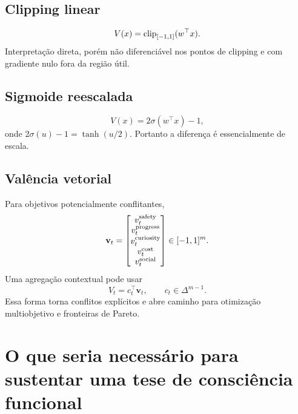 \subsection{Clipping linear}
\begin{equation}
V(x)=\operatorname{clip}_{[-1,1]}(w^\top x).
\end{equation}
Interpretação direta, porém não diferenciável nos pontos de clipping e com gradiente nulo fora da região útil.

\subsection{Sigmoide reescalada}
\begin{equation}
V(x)=2\sigma(w^\top x)-1,
\end{equation}
onde \(2\sigma(u)-1=\tanh(u/2)\). Portanto a diferença é essencialmente de escala.

\subsection{Valência vetorial}

Para objetivos potencialmente conflitantes,
\begin{equation}
\mathbf v_t=
\begin{bmatrix}
v_t^{\rm safety}\\
v_t^{\rm progress}\\
v_t^{\rm curiosity}\\
v_t^{\rm cost}\\
v_t^{\rm social}
\end{bmatrix}
\in[-1,1]^m.
\end{equation}
Uma agregação contextual pode usar
\begin{equation}
V_t=c_t^\top\mathbf v_t,
\qquad c_t\in\Delta^{m-1}.
\end{equation}
Essa forma torna conflitos explícitos e abre caminho para otimização multiobjetivo e fronteiras de Pareto.

\section{O que seria necessário para sustentar uma tese de consciência funcional}


